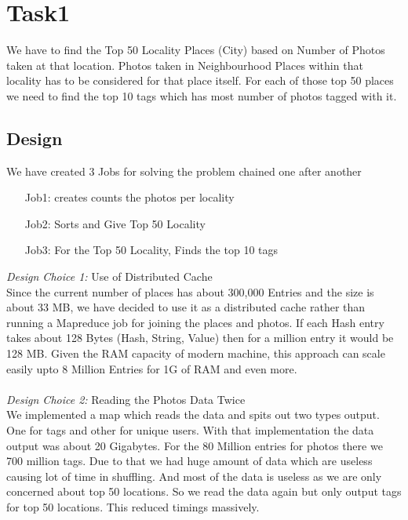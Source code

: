 \chapter{Task1}

	We have to find the Top 50 Locality Places (City) based on Number of Photos taken at that location. Photos taken in Neighbourhood Places within that locality has to be considered for that place itself. For each of those top 50 places we need to find the top 10 tags which has most number of photos tagged with it.
		
\section{Design}
	We have created 3 Jobs for solving the problem chained one after another \\
	\begin{itemize}
		\item [Job1:] creates counts the photos per locality  
		\item [Job2:] Sorts and Give Top 50 Locality 
		\item [Job3:] For the Top 50 Locality, Finds the top 10 tags 
	\end{itemize}

	
	\emph{Design Choice 1:}  Use of Distributed Cache \\
		Since the current number of places has about 300,000 Entries and the size is about 33 MB, we have decided to use it as a distributed cache rather than running a Mapreduce job for joining the places and photos. If each Hash entry takes about 128 Bytes (Hash, String, Value) then for a million entry it would be 128 MB. Given the RAM capacity of modern machine, this approach can scale easily upto 8 Million Entries for 1G of RAM and even more. \\
		\\
	\emph{Design Choice 2:} Reading the Photos Data Twice \\
	 	We implemented a map which reads the data and spits out two types output. One for tags and other for unique users. With that implementation the data output was about 20 Gigabytes. For the 80 Million entries for photos there we 700 million tags. Due to that we had huge amount of data which are useless causing lot of time in shuffling. And most of the data is useless as we are only concerned about top 50 locations. So we read the data again but only output tags for top 50 locations. This reduced timings massively.
	 	

